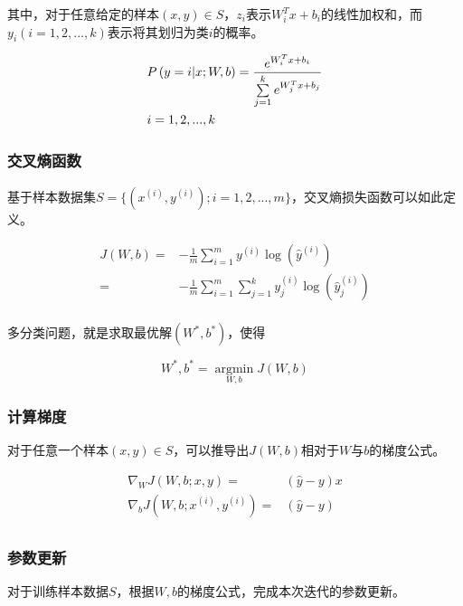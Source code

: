 \begin{content}
其中，对于任意给定的样本$ (x, y) \in S $，$ z_i $表示$W_i^Tx+b_i$的线性加权和，而$y_i(i=1,2,...,k)$表示将其划归为类$i$的概率。

\[\begin{gathered}
  P\left( {y = i|x;W,b} \right) = \frac{{{e^{W_i^Tx + b_i}}}}{{\sum\limits_{j = 1}^k {{e^{W_j^Tx + b_j}}} }} \hfill \\
  i = 1,2,...,k \hfill \\ 
\end{gathered} \]


\subsubsection{交叉熵函数}

基于样本数据集$ S = \{ ({x^{(i)}},{y^{(i)}});i = 1,2,...,m\} $，交叉熵损失函数可以如此定义。

\[\begin{aligned}
  J(W,b) =  &  - \frac{1}{m}\sum\limits_{i = 1}^m {{y^{(i)}}\log \left( {{{\widehat y}^{(i)}}} \right)}  \\ 
   =  &  - \frac{1}{m}\sum\limits_{i = 1}^m {\sum\limits_{j = 1}^k {y_j^{(i)}\log \left( {\widehat y_j^{(i)}} \right)} }  \\
\end{aligned} \]

多分类问题，就是求取最优解$(W^*,b^*)$，使得

\[W^*,b^* = \mathop {\arg \min }\limits_{W,b} J(W,b)\]

\subsubsection{计算梯度}

对于任意一个样本$ (x,y) \in S $，可以推导出$ J(W,b) $相对于$ W $与$ b $的梯度公式。

\[\begin{aligned}
  {\nabla _W}J\left( {W,b;x,y} \right) =  & \left( {\widehat y - y} \right)x \\ 
  {\nabla _b}J\left( {W,b;{x^{(i)}},{y^{(i)}}} \right) =  & \left( {\widehat y - y} \right) \\ 
\end{aligned} \]


\subsubsection{参数更新}

对于训练样本数据$ S $，根据$W, b$的梯度公式，完成本次迭代的参数更新。


\end{content}
